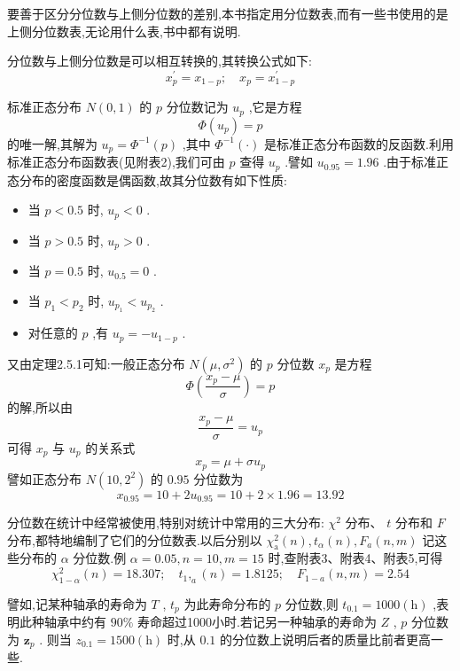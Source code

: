 要善于区分分位数与上侧分位数的差别,本书指定用分位数表,而有一些书使用的是上侧分位数表,无论用什么表,书中都有说明.

分位数与上侧分位数是可以相互转换的,其转换公式如下:
\begin{equation}
x_{p}^{\prime}=x_{1-p} ; \quad x_{p}=x_{1-p}^{\prime} \label{eq:2.7.6}
\end{equation}

\begin{example}\label{exam:2.7.3}
	标准正态分布 $ N(0,1) $ 的 $ p $ 分位数记为 $ u_{p} $ ,它是方程
	\[
	\Phi\left(u_{p}\right)=p
	\]
	的唯一解,其解为 $ u_{p}=\Phi^{-1}(p) $ ,其中 $ \Phi^{-1}(\cdot) $ 是标准正态分布函数的反函数.利用标准正态分布函数表(见附表2),我们可由 $ p $ 查得 $ u_{p} $ .譬如 $ u_{0.95}=1.96 $ .由于标准正态分布的密度函数是偶函数,故其分位数有如下性质:
	
	\begin{itemize}
		\item 当 $ p<0.5 $ 时, $ u_{p}<0 $ .
		\item 当 $ p>0.5 $ 时, $ u_{p}>0 $ .
		\item 当 $ p=0.5 $ 时, $ u_{0.5}=0 $ .
		\item 当 $ p_{1}<p_{2} $ 时, $ u_{p_{1}}<u_{p_{2}} $ .
		\item 对任意的 $ p $ ,有 $ u_{p}=-u_{1-p} $ .
	\end{itemize}
	
	又由定理2.5.1可知:一般正态分布 $ N\left(\mu, \sigma^{2}\right) $ 的 $ p $ 分位数 $ x_{p} $ 是方程
	\[
	\Phi\left(\frac{x_{p}-\mu}{\sigma}\right)=p
	\]
	的解,所以由
	\[
	\frac{x_{p}-\mu}{\sigma}=u_{p}
	\]
	可得 $ x_{p} $ 与 $ u_{p} $ 的关系式
	\begin{equation}
	x_{p}=\mu+\sigma u_{p} \label{eq:2.7.7}
	\end{equation}
	譬如正态分布 $ N\left(10,2^{2}\right) $ 的 $ 0.95 $ 分位数为
	\[
	x_{0.95}=10+2 u_{0.95}=10+2 \times 1.96=13.92
	\]
\end{example}

分位数在统计中经常被使用,特别对统计中常用的三大分布: $ \chi^{2} $ 分布、 $ t $ 分布和 $ F $ 分布,都特地编制了它们的分位数表.以后分别以 $ \chi_{\mathrm{a}}^{2}(n), t_{\alpha}(n) , F_{a}(n, m) $ 记这些分布的 $ \alpha $ 分位数.例 $ \alpha=0.05, n=10, m=15 $ 时,查附表3、附表4、附表5,可得
\[
\chi_{1-\alpha}^{2}(n)=18.307 ; \quad t_{1},_{a}(n)=1.8125 ; \quad F_{1-a}(n, m)=2.54
\]

譬如,记某种轴承的寿命为 $ T $ , $ t_{p} $ 为此寿命分布的 $ p $ 分位数,则 $ t_{0.1}=1000 (\mathrm{h}) $ ,表明此种轴承中约有 $ 90\% $ 寿命超过1000小时.若记另一种轴承的寿命为 $ Z $ , $ p $ 分位数为 $ \boldsymbol{z}_{p} $ . 则当 $ z_{0.1}=1500(\mathrm{h}) $ 时,从 $ 0.1 $ 的分位数上说明后者的质量比前者更高一些.

